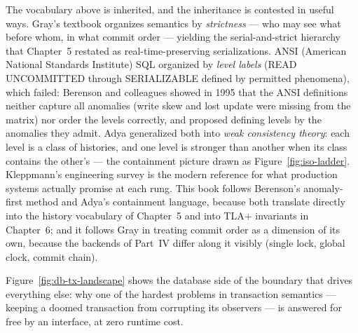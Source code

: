 The vocabulary above is inherited, and the inheritance is contested in useful
ways. Gray's textbook \cite{gray93tp} organizes semantics by \emph{strictness}
--- who may see what before whom, in what commit order --- yielding the
serial-and-strict hierarchy that Chapter~5 restated as real-time-preserving
serializations. ANSI (American National Standards Institute) SQL organized by \emph{level labels} (READ UNCOMMITTED
through SERIALIZABLE defined by permitted phenomena), which failed:
Berenson and colleagues \cite{berenson95critique} showed in 1995 that the
ANSI definitions neither capture all anomalies (write skew and lost update
were missing from the matrix) nor order the levels correctly, and proposed
defining levels by the anomalies they admit. Adya generalized both into
\emph{weak consistency theory}: each level is a class of histories, and one
level is stronger than another when its class contains the other's
\cite{adya99thesis} --- the containment picture drawn as
Figure~\ref{fig:iso-ladder}. Kleppmann's engineering survey \cite{kleppmann17}
is the modern reference for what production systems actually promise at each
rung. This book follows Berenson's anomaly-first method and Adya's containment
language, because both translate directly into the history vocabulary of
Chapter~5 and into TLA+ invariants in Chapter~6; and it follows Gray in
treating commit order as a dimension of its own, because the backends of
Part~IV differ along it visibly (single lock, global clock, commit chain).

Figure~\ref{fig:db-tx-landscape} shows the database side of the boundary that
drives everything else: why one of the hardest problems in transaction
semantics --- keeping a doomed transaction from corrupting its observers ---
is answered for free by an interface, at zero runtime cost.


